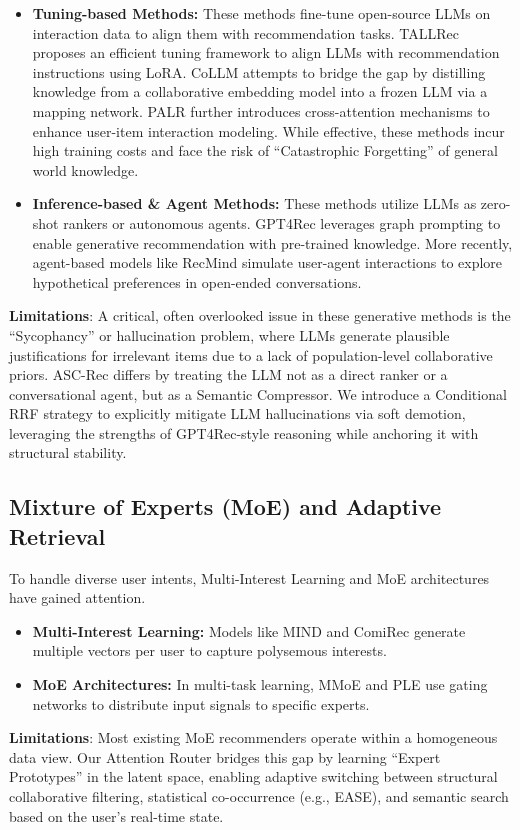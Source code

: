 \begin{itemize}
    \item \textbf{Tuning-based Methods:} These methods fine-tune open-source LLMs on interaction data to align them with recommendation tasks. TALLRec \cite{bao2023tallrec} proposes an efficient tuning framework to align LLMs with recommendation instructions using LoRA. CoLLM \cite{zhang2023collm} attempts to bridge the gap by distilling knowledge from a collaborative embedding model into a frozen LLM via a mapping network. PALR \cite{yang2023palr} further introduces cross-attention mechanisms to enhance user-item interaction modeling. While effective, these methods incur high training costs and face the risk of ``Catastrophic Forgetting'' of general world knowledge.
    
    \item \textbf{Inference-based \& Agent Methods:} These methods utilize LLMs as zero-shot rankers or autonomous agents. GPT4Rec \cite{xu2024gpt4rec} leverages graph prompting to enable generative recommendation with pre-trained knowledge. More recently, agent-based models like RecMind \cite{wang2024recmind} simulate user-agent interactions to explore hypothetical preferences in open-ended conversations.
\end{itemize}

\textbf{Limitations}: A critical, often overlooked issue in these generative methods is the ``Sycophancy'' or hallucination problem, where LLMs generate plausible justifications for irrelevant items due to a lack of population-level collaborative priors. ASC-Rec differs by treating the LLM not as a direct ranker or a conversational agent, but as a Semantic Compressor. We introduce a Conditional RRF strategy to explicitly mitigate LLM hallucinations via soft demotion, leveraging the strengths of GPT4Rec-style reasoning while anchoring it with structural stability.

\subsection{Mixture of Experts (MoE) and Adaptive Retrieval}
To handle diverse user intents, Multi-Interest Learning and MoE architectures have gained attention.

\begin{itemize}
    \item \textbf{Multi-Interest Learning:} Models like MIND \cite{li2019mind} and ComiRec \cite{cen2020comirec} generate multiple vectors per user to capture polysemous interests.
    \item \textbf{MoE Architectures:} In multi-task learning, MMoE \cite{ma2018modeling} and PLE \cite{tang2020progressive} use gating networks to distribute input signals to specific experts.
\end{itemize}

\textbf{Limitations}: Most existing MoE recommenders operate within a homogeneous data view. Our Attention Router bridges this gap by learning ``Expert Prototypes'' in the latent space, enabling adaptive switching between structural collaborative filtering, statistical co-occurrence (e.g., EASE), and semantic search based on the user's real-time state.